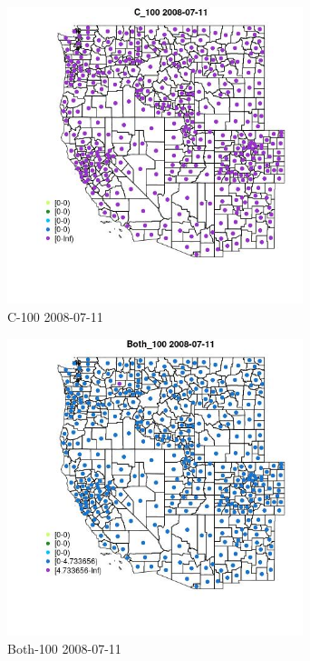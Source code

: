 \begin{figure} 
\centering  
\includegraphics[width=0.77\textwidth]{Code_Outputs/df_report_ML_predictors_CountyCentroid_Locations_Dates_2008-01-01to2018-12-31_MapObsC_1002008-07-11.jpg} 
\caption{\label{fig:df_report_ML_predictors_CountyCentroid_Locations_Dates_2008-01-01to2018-12-31MapObsC_1002008-07-11}C-100 2008-07-11} 
\end{figure} 
 

\begin{figure} 
\centering  
\includegraphics[width=0.77\textwidth]{Code_Outputs/df_report_ML_predictors_CountyCentroid_Locations_Dates_2008-01-01to2018-12-31_MapObsBoth_1002008-07-11.jpg} 
\caption{\label{fig:df_report_ML_predictors_CountyCentroid_Locations_Dates_2008-01-01to2018-12-31MapObsBoth_1002008-07-11}Both-100 2008-07-11} 
\end{figure} 
 

